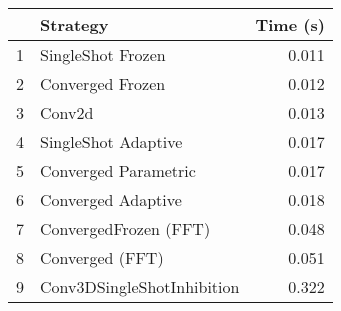 \begin{tabular}{llr}
\toprule
{} &                    Strategy & Time (s) \\
\midrule
1 &           SingleShot Frozen &    0.011 \\
2 &            Converged Frozen &    0.012 \\
3 &                      Conv2d &    0.013 \\
4 &         SingleShot Adaptive &    0.017 \\
5 &        Converged Parametric &    0.017 \\
6 &          Converged Adaptive &    0.018 \\
7 &       ConvergedFrozen (FFT) &    0.048 \\
8 &             Converged (FFT) &    0.051 \\
9 &  Conv3DSingleShotInhibition &    0.322 \\
\bottomrule
\end{tabular}
